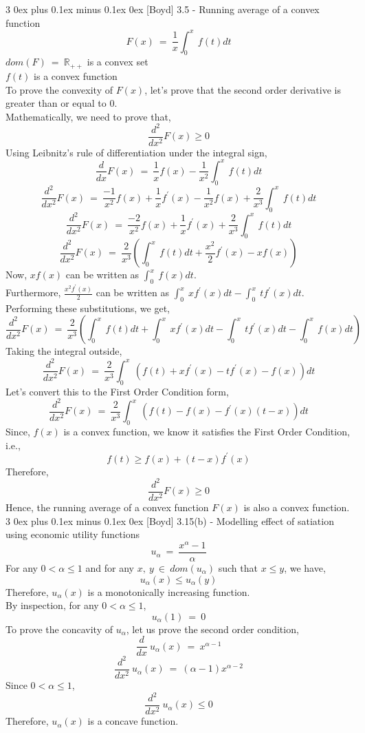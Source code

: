 \documentclass[12pt, draftcls, onecolumn]{IEEEtran}
\makeatletter
\def\subsubsection{\@startsection{subsubsection}%
                                 {3}%
                                 {\z@}%
                                 {0ex plus 0.1ex minus 0.1ex}%
                                 {0ex}%
                                 {\normalfont\normalsize\bfseries}}%
\makeatother
\begin{document}
\subsubsection{[Boyd] 3.5 - Running average of a convex function}
\[F(x)\ =\ \frac{1}{x} \int_{0}^{x}\ f(t) dt\]
$dom(F)\ =\ \mathbb{R}_{++}$ is a convex set
\\$f(t)$ is a convex function
\\To prove the convexity of $F(x)$, let's prove that the second order derivative is greater than or equal to 0.
\\Mathematically, we need to prove that,
\[\frac{d^2}{dx^2} F(x) \geq 0\]
Using Leibnitz's rule of differentiation under the integral sign,
\[\frac{d}{dx} F(x)\ =\ \frac{1}{x} f(x) - \frac{1}{x^2} \int_{0}^{x}\ f(t) dt\]
\[\frac{d^2}{dx^2} F(x)\ =\ \frac{-1}{x^2} f(x) + \frac{1}{x} f^{'}(x) - \frac{1}{x^2} f(x) + \frac{2}{x^3} \int_{0}^{x}\ f(t) dt\]
\[\frac{d^2}{dx^2} F(x)\ =\ \frac{-2}{x^2} f(x) + \frac{1}{x} f^{'}(x) + \frac{2}{x^3} \int_{0}^{x}\ f(t) dt\]
\[\frac{d^2}{dx^2} F(x)\ =\ \frac{2}{x^3}(\int_{0}^{x}\ f(t) dt + \frac{x^2}{2} f^{'}(x) - x f(x))\]
Now, $x f(x)$ can be written as $\int_{0}^{x}\ f(x) dt$.
\\Furthermore, $\frac{x^2 f^{'}(x)}{2}$ can be written as $\int_{0}^{x}\ x f^{'}(x)dt - \int_{0}^{x}\ tf^{'}(x) dt$.
\\Performing these substitutions, we get,
\[\frac{d^2}{dx^2} F(x)\ =\ \frac{2}{x^3}(\int_{0}^{x}\ f(t) dt + \int_{0}^{x}\ x f^{'}(x)dt - \int_{0}^{x}\ tf^{'}(x) dt - \int_{0}^{x}\ f(x) dt)\]
Taking the integral outside,
\[\frac{d^2}{dx^2} F(x)\ =\ \frac{2}{x^3} \int_{0}^{x}\ (f(t) + x f^{'}(x) - tf^{'}(x) - f(x))dt\]
Let's convert this to the First Order Condition form,
\[\frac{d^2}{dx^2} F(x)\ =\ \frac{2}{x^3} \int_{0}^{x}\ (f(t) - f(x) - f^{'}(x)(t-x))dt\]
Since, $f(x)$ is a convex function, we know it satisfies the First Order Condition, i.e.,
\[f(t) \geq f(x) + (t-x) f^{'}(x)\]
Therefore,
\[\frac{d^2}{dx^2} F(x) \geq 0\]
Hence, the running average of a convex function $F(x)$ is also a convex function.
\subsubsection{[Boyd] 3.15(b) - Modelling effect of satiation using economic utility functions}
\[u_\alpha\ =\ \frac{x^\alpha - 1}{\alpha}\]
For any $0 < \alpha \leq 1$ and for any $x,\ y\ \in\ dom(u_\alpha)$ such that $x \leq y$, we have,
\[u_\alpha(x) \leq u_\alpha(y)\]
Therefore, $u_\alpha(x)$ is a monotonically increasing function.
\\By inspection, for any $0 < \alpha \leq 1$,
\[u_\alpha(1)\ =\ 0\]
To prove the concavity of $u_\alpha$, let us prove the second order condition,
\[\frac{d}{dx}\ u_\alpha(x)\ =\ x^{\alpha - 1}\]
\[\frac{d^2}{dx^2}\ u_\alpha(x)\ =\ (\alpha - 1) x^{\alpha - 2}\]
Since $0 < \alpha \leq 1$,
\[\frac{d^2}{dx^2}\ u_\alpha(x) \leq 0\]
Therefore, $u_\alpha(x)$ is a concave function.
\end{document}
